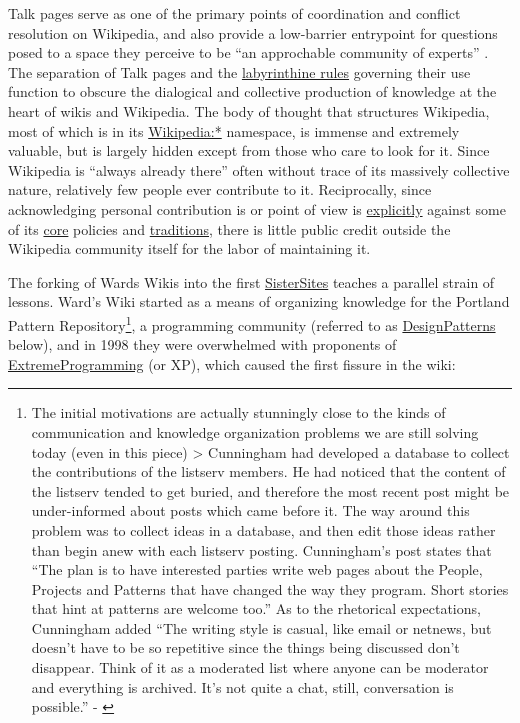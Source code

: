Talk pages serve as one of the primary points of coordination and
conflict resolution on Wikipedia, and also provide a low-barrier
entrypoint for questions posed to a space they perceive to be ``an
approchable community of experts'' \citep{viegasTalkYouType2007} .
The separation of Talk pages and the
\href{https://en.wikipedia.org/wiki/Wikipedia:Talk_page_guidelines}{labyrinthine
rules} governing their use function to obscure the dialogical and
collective production of knowledge at the heart of wikis and Wikipedia.
The body of thought that structures Wikipedia, most of which is in its
\href{https://en.wikipedia.org/wiki/Wikipedia:Community_portal}{Wikipedia:*}
namespace, is immense and extremely valuable, but is largely hidden
except from those who care to look for it. Since Wikipedia is ``always
already there'' often without trace of its massively collective nature,
relatively few people ever contribute to it. Reciprocally, since
acknowledging personal contribution is or point of view is
\href{https://en.wikipedia.org/wiki/Wikipedia:No_original_research}{explicitly}
against some of its
\href{https://en.wikipedia.org/wiki/Wikipedia:Neutral_point_of_view}{core}
policies and
\href{https://en.wikipedia.org/wiki/Wikipedia:Avoid_thread_mode}{traditions},
there is little public credit outside the Wikipedia community itself for
the labor of maintaining it.

The forking of Wards Wikis into the first
\href{http://wiki.c2.com/?SisterSites}{SisterSites} teaches a parallel
strain of lessons. Ward's Wiki started as a means of organizing
knowledge for the Portland Pattern Repository\footnote{The initial
  motivations are actually stunningly close to the kinds of
  communication and knowledge organization problems we are still solving
  today (even in this piece) \textgreater{} Cunningham had developed a
  database to collect the contributions of the listserv members. He had
  noticed that the content of the listserv tended to get buried, and
  therefore the most recent post might be under-informed about posts
  which came before it. The way around this problem was to collect ideas
  in a database, and then edit those ideas rather than begin anew with
  each listserv posting. Cunningham's post states that ``The plan is to
  have interested parties write web pages about the People, Projects and
  Patterns that have changed the way they program. Short stories that
  hint at patterns are welcome too.'' As to the rhetorical expectations,
  Cunningham added ``The writing style is casual, like email or netnews,
  but doesn't have to be so repetitive since the things being discussed
  don't disappear. Think of it as a moderated list where anyone can be
  moderator and everything is archived. It's not quite a chat, still,
  conversation is possible.'' - \citep{cummingsWhatWasWikiWhy2009} }, a programming community (referred to as
\href{http://wiki.c2.com/?DesignPatterns}{DesignPatterns} below), and in
1998 they were overwhelmed with proponents of
\href{http://wiki.c2.com/?ExtremeProgramming}{ExtremeProgramming} (or
XP), which caused the first fissure in the wiki:

